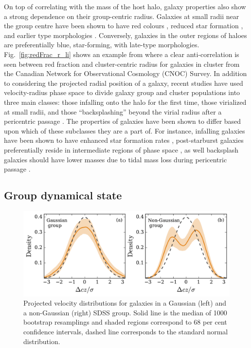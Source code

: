 On top of correlating with the mass of the host halo, galaxy
properties also show a strong dependence on their group-centric
radius.  Galaxies at small radii near the group centre have been shown
to have red colours \citep{blanton2007b, hansen2009, li2009,
  prescott2011}, reduced star formation
\citep{rasmussen2012, wetzel2012, haines2015}, and earlier type
morphologies
\citep{whitmore1993, goto2003, postman2005, fasano2015}.  Conversely, galaxies in the outer regions of
haloes are preferentially blue, star-forming, with late-type
morphologies.  Fig.~\ref{fig:redFrac_r_li} shows an example from
\citet{li2009} where a clear anti-correlation is seen between red
fraction and cluster-centric radius for galaxies in cluster from the
Canadian Network for Observational Cosmology (CNOC) Survey. In
addition to considering the projected radial
position of a galaxy, recent studies have used velocity-radius phase
space to divide galaxy group and cluster populations into three main
classes: those infalling onto the halo for the first time, those
virialized at small radii, and those ``backsplashing'' beyond the
virial radius after a pericentric passage
\citep[e.g.][]{mahajan2011}.  The
properties of galaxies have been shown to differ based upon which of
these subclasses they are a part of.  For instance, infalling galaxies
have been shown to have enhanced star formation rates \citep{noble2016}, post-starburst galaxies preferentially reside in
intermediate regions of phase space \citep{muzzin2014}, as well
backsplash galaxies should have lower masses due to tidal mass loss
during pericentric passage \citep{gill2005}.  

\subsection{Group dynamical state}
\label{sec:dyn_state}

\begin{figure}[!ht]
  \centering
  \includegraphics[width=\textwidth]{vdist.pdf}
  \caption{Projected velocity distributions for galaxies in a
    Gaussian (left) and a non-Gaussian (right) SDSS group.  Solid line
    is the median of 1000
  bootstrap resamplings and shaded regions correspond to 68 per cent
  confidence intervals, dashed line corresponds to the standard normal
  distribution.}
  \label{fig:vdist}
\end{figure}

